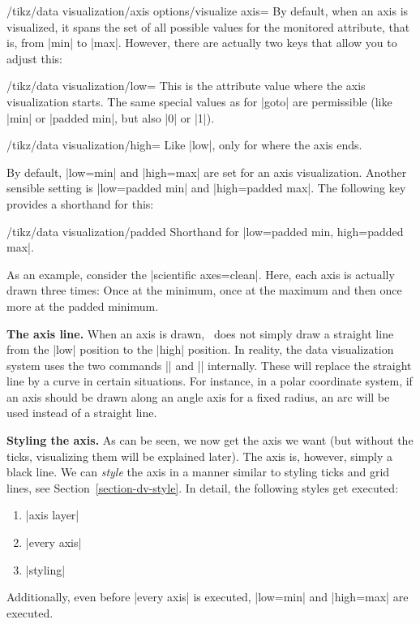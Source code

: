 \begin{key}{/tikz/data visualization/axis options/visualize axis=}
  By default, when an axis is visualized, it spans the set of all
  possible values for the monitored attribute, that is, from |min| to
  |max|. However, there are actually two keys that allow you to adjust
  this:
  \begin{key}{/tikz/data visualization/low=}
    This is the attribute value where the axis visualization
    starts. The same special values as for |goto| are permissible
    (like |min| or |padded min|, but also |0| or |1|).
  \end{key}
  \begin{key}{/tikz/data visualization/high=}
    Like |low|, only for where the axis ends.
  \end{key}

  By default, |low=min| and |high=max| are set for an axis
  visualization. Another sensible setting is |low=padded min| and
  |high=padded max|. The following key provides a shorthand for this:
  \begin{key}{/tikz/data visualization/padded}
    Shorthand for |low=padded min, high=padded max|.
  \end{key}
  As an example, consider the |scientific axes=clean|. Here, each axis
  is actually drawn three times: Once at the minimum, once at the
  maximum and then once more at the padded minimum. 

    
  \medskip
  \textbf{The axis line.}
  When an axis is drawn, \tikzname\ does not simply draw a straight
  line from the |low| position to the |high| position. In reality, the
  data visualization system uses the two commands |\pgfpathdvmoveto|
  and |\pgfpathdvlineto| internally. These will replace the straight
  line by a curve in certain situations. For instance, in a polar
  coordinate system, if an axis should be drawn along an angle axis
  for a fixed radius, an arc will be used instead of a straight line.
    
  \medskip
  \textbf{Styling the axis.}
  As can be seen, we now get the axis we want (but without the ticks,
  visualizing them will be explained later). The axis is, however,
  simply a black line. We can \emph{style} the axis in a manner
  similar to styling ticks and grid lines, see
  Section~\ref{section-dv-style}. In detail, the following styles get
  executed:
  \begin{enumerate}
  \item |axis layer|
  \item |every axis|
  \item |styling|
  \end{enumerate}
  Additionally, even before |every axis| is executed, |low=min| and
  |high=max| are executed.
  

\end{key}
